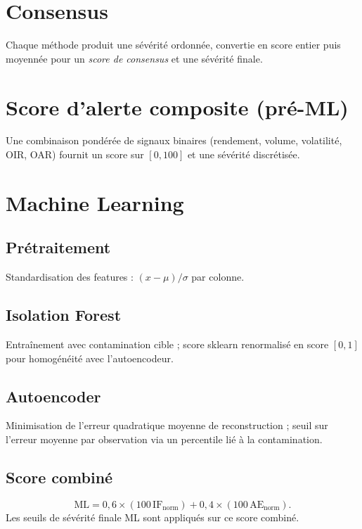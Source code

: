 \documentclass[a4paper,12pt,twoside,openright]{report}
\begin{document}
\section{Consensus}
Chaque méthode produit une sévérité ordonnée, convertie en score entier puis moyennée pour un \emph{score de consensus} et une sévérité finale.

\section{Score d'alerte composite (pré-ML)}
Une combinaison pondérée de signaux binaires (rendement, volume, volatilité, OIR, OAR) fournit un score sur $[0,100]$ et une sévérité discrétisée.

\section{Machine Learning}
\subsection{Prétraitement}
Standardisation des features : $(x-\mu)/\sigma$ par colonne.

\subsection{Isolation Forest}
Entraînement avec contamination cible ; score sklearn renormalisé en score $[0,1]$ pour homogénéité avec l'autoencodeur.

\subsection{Autoencoder}
Minimisation de l'erreur quadratique moyenne de reconstruction ; seuil sur l'erreur moyenne par observation via un percentile lié à la contamination.

\subsection{Score combiné}
\begin{equation}
\mathrm{ML}=0{,}6\times(100\,\mathrm{IF}_{\mathrm{norm}})+0{,}4\times(100\,\mathrm{AE}_{\mathrm{norm}}).
\end{equation}
Les seuils de sévérité finale ML sont appliqués sur ce score combiné.



\end{document}
